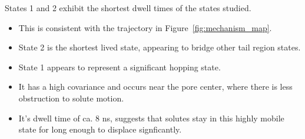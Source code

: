 \documentclass{article}
\begin{document}
  \noindent States 1 and 2 exhibit the shortest dwell times of the states studied.
  \begin{itemize}
      \item This is consistent with the trajectory in Figure~\ref{fig:mechanism_map}.
      \item State 2 is the shortest lived state, appearing to bridge other tail region
      states. 
      \item State 1 appears to represent a significant hopping state. 
      \item It has a high covariance and occurs near the pore center, where there is
      less obstruction to solute motion.
      \item It's dwell time of ca. 8 ns, suggests that solutes stay in this highly
      mobile state for long enough to displace signficantly.
  \end{itemize}
  
\end{document}

